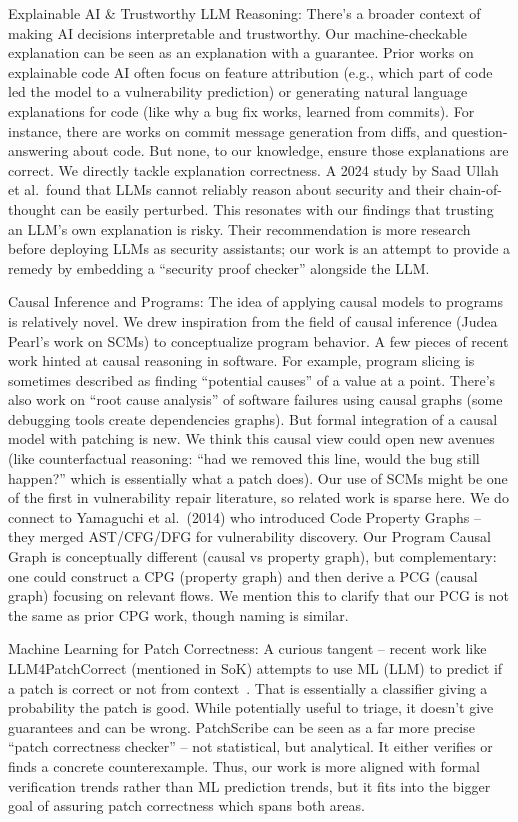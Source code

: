 \documentclass[conference,compsoc]{IEEEtran}
\begin{document}
Explainable AI \& Trustworthy LLM Reasoning: There's a broader context
of making AI decisions interpretable and trustworthy. Our
machine-checkable explanation can be seen as an explanation with a
guarantee. Prior works on explainable code AI often focus on feature
attribution (e.g., which part of code led the model to a vulnerability
prediction) or generating natural language explanations for code (like
why a bug fix works, learned from commits). For instance, there are
works on commit message generation from diffs, and question-answering
about code. But none, to our knowledge, ensure those explanations are
correct. We directly tackle explanation correctness. A 2024 study by
Saad Ullah et al.~found that LLMs cannot reliably reason about security
and their chain-of-thought can be easily perturbed. This resonates with
our findings that trusting an LLM's own explanation is risky. Their
recommendation is more research before deploying LLMs as security
assistants; our work is an attempt to provide a remedy by embedding a
``security proof checker'' alongside the LLM.

Causal Inference and Programs: The idea of applying causal models to
programs is relatively novel. We drew inspiration from the field of
causal inference (Judea Pearl's work on SCMs) to conceptualize program
behavior. A few pieces of recent work hinted at causal reasoning in
software. For example, program slicing is sometimes described as finding
``potential causes'' of a value at a point. There's also work on ``root
cause analysis'' of software failures using causal graphs (some
debugging tools create dependencies graphs). But formal integration of a
causal model with patching is new. We think this causal view could open
new avenues (like counterfactual reasoning: ``had we removed this line,
would the bug still happen?'' which is essentially what a patch does).
Our use of SCMs might be one of the first in vulnerability repair
literature, so related work is sparse here. We do connect to Yamaguchi
et al.~(2014) who introduced Code Property Graphs -- they merged
AST/CFG/DFG for vulnerability discovery. Our Program Causal Graph is
conceptually different (causal vs property graph), but complementary:
one could construct a CPG (property graph) and then derive a PCG (causal
graph) focusing on relevant flows. We mention this to clarify that our
PCG is not the same as prior CPG work, though naming is similar.

Machine Learning for Patch Correctness: A curious tangent -- recent work
like LLM4PatchCorrect (mentioned in SoK) attempts to use ML (LLM) to
predict if a patch is correct or not from context~\cite{wang2024sok}. That is
essentially a classifier giving a probability the patch is good. While
potentially useful to triage, it doesn't give guarantees and can be
wrong. PatchScribe can be seen as a far more precise ``patch correctness
checker'' -- not statistical, but analytical. It either verifies or
finds a concrete counterexample. Thus, our work is more aligned with
formal verification trends rather than ML prediction trends, but it fits
into the bigger goal of assuring patch correctness which spans both
areas.
\end{document}
